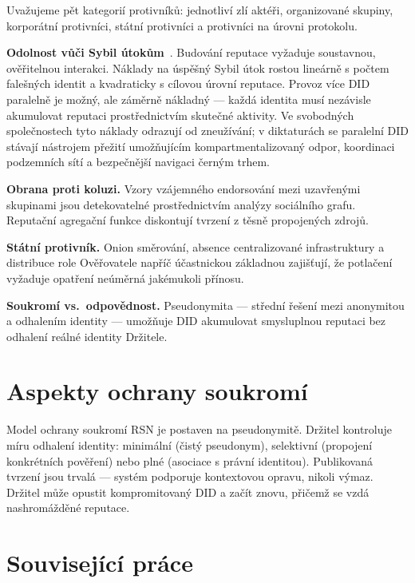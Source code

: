 \documentclass[11pt,a4paper,twocolumn]{article}
\begin{document}
Uvažujeme pět kategorií protivníků: jednotliví zlí aktéři, organizované skupiny, korporátní protivníci, státní protivníci a protivníci na úrovni protokolu.

\textbf{Odolnost vůči Sybil útokům}~\cite{douceur2002}. Budování reputace vyžaduje soustavnou, ověřitelnou interakci. Náklady na úspěšný Sybil útok rostou lineárně s počtem falešných identit a kvadraticky s cílovou úrovní reputace. Provoz více DID paralelně je možný, ale záměrně nákladný --- každá identita musí nezávisle akumulovat reputaci prostřednictvím skutečné aktivity. Ve svobodných společnostech tyto náklady odrazují od zneužívání; v diktaturách se paralelní DID stávají nástrojem přežití umožňujícím kompartmentalizovaný odpor, koordinaci podzemních sítí a bezpečnější navigaci černým trhem.

\textbf{Obrana proti koluzi.} Vzory vzájemného endorsování mezi uzavřenými skupinami jsou detekovatelné prostřednictvím analýzy sociálního grafu. Reputační agregační funkce diskontují tvrzení z těsně propojených zdrojů.

\textbf{Státní protivník.} Onion směrování, absence centralizované infrastruktury a distribuce role Ověřovatele napříč účastnickou základnou zajišťují, že potlačení vyžaduje opatření neúměrná jakémukoli přínosu.

\textbf{Soukromí vs.\ odpovědnost.} Pseudonymita --- střední řešení mezi anonymitou a odhalením identity --- umožňuje DID akumulovat smysluplnou reputaci bez odhalení reálné identity Držitele.

\section{Aspekty ochrany soukromí}

Model ochrany soukromí RSN je postaven na pseudonymitě. Držitel kontroluje míru odhalení identity: minimální (čistý pseudonym), selektivní (propojení konkrétních pověření) nebo plné (asociace s právní identitou). Publikovaná tvrzení jsou trvalá --- systém podporuje kontextovou opravu, nikoli výmaz. Držitel může opustit kompromitovaný DID a začít znovu, přičemž se vzdá nashromážděné reputace.

\section{Související práce}
\end{document}
